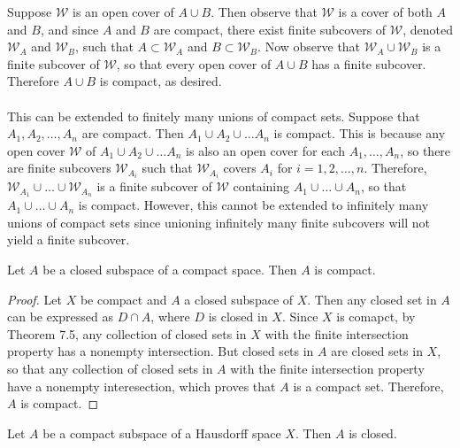 \documentclass[a4paper,12pt,twoside]{hmcpset}
\begin{document}
\begin{solution}
Suppose $\mathcal{W}$ is an open cover of $A \cup B$. Then observe
that $\mathcal{W}$ is a cover of both $A$ and $B$, and since $A$ and
$B$ are compact, there exist finite subcovers of $\mathcal{W}$,
denoted $\mathcal{W}_A$ and $\mathcal{W}_B$, such that $A \subset
\mathcal{W}_A$
and $B \subset \mathcal{W}_B$. Now observe that
$\mathcal{W}_A \cup \mathcal{W}_B$ is a finite subcover of
$\mathcal{W}$, so that every open cover of $A \cup B$ has a finite
subcover. Therefore $A \cup B$ is compact, as desired. \\
\\
This can be extended to finitely many unions of compact sets. Suppose
that $A_1, A_2, \dots , A_n$ are compact. Then $A_1 \cup A_2 \cup
\dots A_n$ is compact. This is because any open cover $\mathcal{W}$ of
$A_1 \cup A_2 \cup \dots A_n$ is also an open cover for each $A_1,
\dots, A_n$, so there are finite subcovers $\mathcal{W}_{A_i}$ such
that $\mathcal{W}_{A_i}$ covers $A_i$ for $i = 1, 2, \dots, n$.
Therefore, $\mathcal{W}_{A_1} \cup \dots \cup \mathcal{W}_{A_n}$ is a
finite subcover of $\mathcal{W}$ containing $A_1 \cup \dots \cup A_n$,
so that $A_1 \cup \dots \cup A_n$ is compact. However, this cannot be
extended to infinitely many unions of compact sets since unioning
infinitely many finite subcovers will not yield a finite subcover.
\end{solution}

\begin{problem}[Theorem 7.8] Let $A$ be a closed subspace of a compact
    space. Then $A$ is compact. 
\end{problem}

\begin{proof}
    Let $X$ be compact and $A$ a closed subspace of $X$. Then any
    closed set in $A$ can be
    expressed as $D \cap A$, where $D$ is closed in $X$. Since $X$ is
    comapct, by Theorem
    7.5, any
    collection of closed sets in $X$ with the finite intersection
    property has a nonempty intersection. But closed sets in $A$ are
    closed sets in $X$, so that any collection of closed sets in $A$ with the
    finite intersection property have a nonempty interesection, which
    proves that $A$ is a compact set. Therefore, $A$ is compact. 
\end{proof}

\begin{problem}[Theorem 7.9] Let $A$ be a compact subspace of a
    Hausdorff space $X$. Then $A$ is closed.
\end{problem}
 
\end{document}
